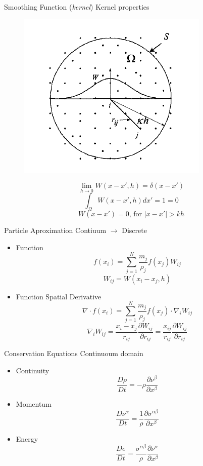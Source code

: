 \documentclass[10pt]{beamer}
\begin{document}
\begin{frame}{Smoothing Function (\textit{kernel})}
Kernel properties
\begin{figure}[h!]
\includegraphics[scale=.5]{./images/ParticleApprox.png}
\end{figure}
$$\lim_{h\to0}{W(x-x',h)}=\delta(x-x')$$
$$\int_{\Omega}W(x-x',h)dx'=1=0$$
$$W(x-x')=0\text{, for }|x-x'|>kh$$
\end{frame}

\begin{frame}{Particle Aproximation}
Contiuum $\to$ Discrete
\begin{itemize}
\item Function
\[f(x_i)=\sum_{j=1}^{N}{\frac{m_j}{\rho_j}f(x_j)W_{ij}}\]
\[W_{ij}=W(x_i-x_j,h)\]
\item Function Spatial Derivative
\[ \nabla\cdot f(x_i)=\sum_{j=1}^{N}{\frac{m_j}{\rho_j}f(x_j)\cdot\nabla_i W_{ij}}\]
\[\nabla_iW_{ij}=\frac{x_i-x_j}{r_{ij}}\frac{\partial W_{ij} }{\partial r_{ij}}=\frac{x_{ij}}{r_{ij}}\frac{\partial W_{ij}}{\partial r_{ij}}\]
\end{itemize}
\end{frame}

\begin{frame}{Conservation Equations}
Continuoum domain
\begin{itemize}
\item Continuity
\[\frac{D\rho}{Dt}=-\rho\frac{\partial \nu^\beta}{\partial x^\beta}\]
\item Momentum
\[\frac{D\nu^\alpha}{Dt}=\frac{1}{\rho}\frac{\partial\sigma^{\alpha\beta}}{\partial x^\beta}\]
\item Energy
\[\frac{De}{Dt}=\frac{\sigma^{\alpha\beta}}{\rho}\frac{\partial\nu^\alpha}{\partial x^\beta}\]
\end{itemize}
\end{frame}
\end{document}
